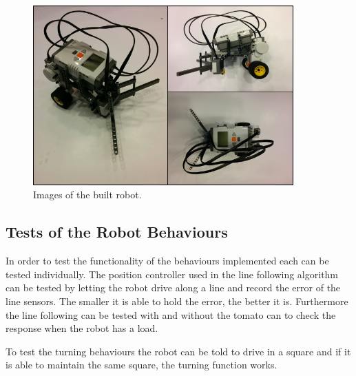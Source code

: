 \documentclass[12pt,a4paper]{article}
\begin{document}
\begin{figure}[H]
\includegraphics[width=10cm]{Fig1.png}
\centering
\caption{Images of the built robot.}
\label{fig:robotImage}
\end{figure}


\subsection{Tests of the Robot Behaviours}
In order to test the functionality of the behaviours implemented each can be tested individually.
The position controller used in the line following algorithm can be tested by letting the robot drive along a line and record the error of the line sensors.
The smaller it is able to hold the error, the better it is.
Furthermore the line following can be tested with and without the tomato can to check the response when the robot has a load.

To test the turning behaviours the robot can be told to drive in a square and if it is able to maintain the same square, the turning function works.




\end{document}

